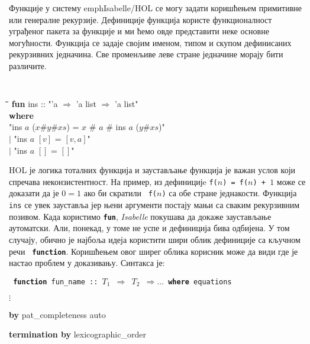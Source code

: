 Функције у систему emph{Isabelle/HOL} се могу задати коришћењем
примитивне или генералне рекурзије. Дефиниције функција користе
функционалност уграђеног пакета за функције \cite{functions} и ми ћемо
овде представити неке основне могућности. Функција се задаје својим
именом, типом и скупом дефинисаних рекурзивних једначина. Све
променљиве леве стране једначине морају бити различите.

\smallskip
{}
\begin{small}
{\tt 
\begin{tabbing}
\hspace{5mm}\=\hspace{5mm}\=\hspace{5mm}\=\hspace{5mm}\=\hspace{5mm}\=\kill
\textbf{fun} ins :: "'a $\Rightarrow$ 'a list $\Rightarrow$ 'a list" \\
\textbf{where} \\
\>\>      "ins $a$ ($x$\#$y$\#$xs$) = $x$ \# $a$ \# ins $a$ ($y$\#$xs$)" \\
\> $|$ \> "ins $a$ $[v]$ = $[v, a]$" \\
\> $|$ \> "ins $a$ $[]$ = $[]$"
\end{tabbing}
}
\end{small}
\smallskip


HOL је логика тоталних функција и заустављање функција је важан услов
који спречава неконзистентност. На пример, из дефиницијe {\tt f($n$) =
  f($n$) + $1$} може се доказати да је $0 = 1$ ако би скратили {\tt
  f($n$)} са обе стране једнакости. Функција {\tt ins} се увек
зауставља јер њени аргументи постају мањи са сваким рекурзивним
позивом.  Када користимо {\tt \textbf{fun}}, \emph{Isabelle} покушава
да докаже заустављање аутоматски. Али, понекад, у томе не успе и
дефиниција бива одбијена.  У том случају, обично је најбоља идеја
користити шири облик дефиниције са кључном речи {\tt
  \textbf{function}}. Коришћењем овог ширег облика корисник може да
види где је настао проблем у доказивању. Синтакса је:

\smallskip

\begin{small}
{\tt 
\textbf{function} fun\_name :: $T_1$ $\Longrightarrow$ $T_2$ $\Longrightarrow \ldots$ \textbf{where}
equations

$\vdots$

 \textbf{by} pat\_completeness auto

\textbf{termination by} lexicographic\_order
}
\end{small}
\smallskip

